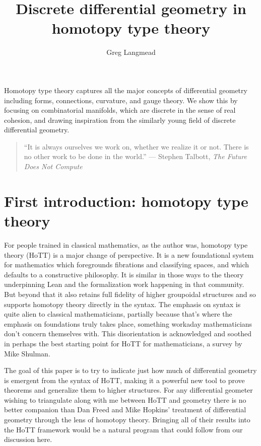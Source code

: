 \documentclass[12pt]{article}
\title{Discrete differential geometry in homotopy type theory}
\author{Greg Langmead}
\renewenvironment{abstract}{\section*{\abstractname}}{}
\begin{document}
\maketitle

\begin{abstract}
Homotopy type theory captures all the major concepts of differential geometry including forms, connections, curvature, and gauge theory. We show this by focusing on combinatorial manifolds, which are discrete in the sense of real cohesion\cite{shulman_cohesion}, and drawing inspiration from the similarly young field of discrete differential geometry.

\end{abstract}

\begin{quote} 
\centering
``It is always ourselves we work on, whether we realize it or not. There is no other work to be done in the world.'' --- Stephen Talbott, \emph{The Future Does Not Compute}\cite{talbott}
\end{quote}

\section{First introduction: homotopy type theory}
For people trained in classical mathematics, as the author was, homotopy type theory (HoTT) is a major change of perspective. It is a new foundational system for mathematics which foregrounds fibrations and classifying spaces, and which defaults to a constructive philosophy. It is similar in those ways to the theory underpinning Lean and the formalization work happening in that community. But beyond that it also retains full fidelity of higher groupoidal structures and so supports homotopy theory directly in the syntax. The emphasis on syntax is quite alien to classical mathematicians, partially because that's where the emphasis on foundations truly takes place, something workaday mathematicians don't concern themselves with. This disorientation is acknowledged and soothed in perhaps the best starting point for HoTT for mathematicians, a survey by Mike Shulman\cite{shulman_logic_of_space}.

The goal of this paper is to try to indicate just how much of differential geometry is emergent from the syntax of HoTT, making it a powerful new tool to prove theorems and generalize them to higher structures. For any differential geometer wishing to triangulate along with me between HoTT and geometry there is no better companion than Dan Freed and Mike Hopkins' treatment of differential geometry through the lens of homotopy theory\cite{freed2013chernweil}. Bringing all of their results into the HoTT framework would be a natural program that could follow from our discussion here.
\end{document}
